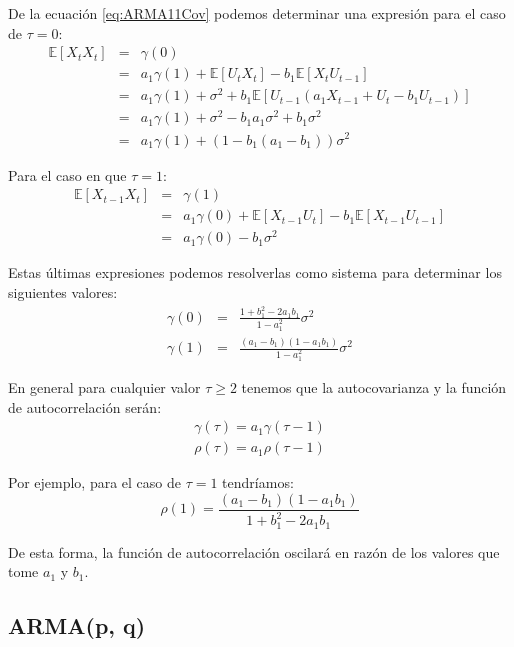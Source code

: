 \documentclass[
]{book}
\begin{document}
De la ecuación \eqref{eq:ARMA11Cov} podemos determinar una expresión para el caso de \(\tau = 0\):
\begin{eqnarray}
    \mathbb{E}[X_{t} X_t] & = & \gamma(0) \nonumber \\
    & = & a_1 \gamma(1) + \mathbb{E}[U_t X_t] - b_1 \mathbb{E}[X_t U_{t-1}] \nonumber \\
    & = & a_1 \gamma(1) + \sigma^2 + b_1 \mathbb{E}[U_{t-1} (a_1 X_{t-1} + U_t - b_1 U_{t-1})] \nonumber \\
    & = & a_1 \gamma(1) + \sigma^2 - b_1 a_1 \sigma^2 + b_1 \sigma^2 \nonumber \\
    & = & a_1 \gamma(1) + (1 - b_1 (a_1 - b_1)) \sigma^2
\end{eqnarray}

Para el caso en que \(\tau = 1\): \begin{eqnarray}
    \mathbb{E}[X_{t-1} X_t] & = & \gamma(1) \nonumber \\
    & = & a_1 \gamma(0) + \mathbb{E}[X_{t-1} U_t] - b_1 \mathbb{E}[X_{t-1} U_{t-1}] \nonumber \\
    & = & a_1 \gamma(0) - b_1 \sigma^2
\end{eqnarray}

Estas últimas expresiones podemos resolverlas como sistema para determinar los siguientes valores:
\begin{eqnarray}
    \gamma(0) & = & \frac{1 + b_1^2 - 2 a_1 b_1}{1 - a_1^2} \sigma^2 \\
    \gamma(1) & = & \frac{(a_1 - b_1)(1 - a_1 b_1)}{1 - a_1^2} \sigma^2
\end{eqnarray}

En general para cualquier valor \(\tau \geq 2\) tenemos que la autocovarianza y la función de autocorrelación serán:
\begin{eqnarray}
    \gamma(\tau) = a_1 \gamma(\tau - 1) \\
    \rho(\tau) = a_1 \rho(\tau - 1)
\end{eqnarray}

Por ejemplo, para el caso de \(\tau = 1\) tendríamos:
\begin{equation}
    \rho(1) = \frac{(a_1 - b_1)(1 - a_1 b_1)}{1 + b_1^2 - 2 a_1 b_1}
\end{equation}

De esta forma, la función de autocorrelación oscilará en razón de los valores que tome \(a_1\) y \(b_1\).

\hypertarget{armap-q}{%
\subsection{ARMA(p, q)}\label{armap-q}}
\end{document}
